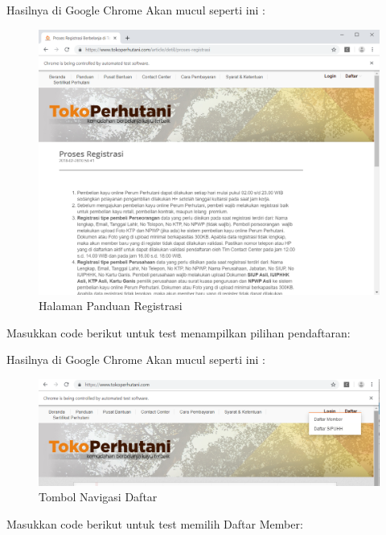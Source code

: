 Hasilnya  di Google Chrome Akan mucul seperti ini :
\begin{figure}[h]
	\centering
	\includegraphics[scale=0.23]{figures/1pdregis}
	\caption{Halaman Panduan Registrasi}
\end{figure}

Masukkan code berikut untuk test menampilkan pilihan pendaftaran:


Hasilnya  di Google Chrome Akan mucul seperti ini :
\begin{figure}[h]
	\centering
	\includegraphics[scale=0.42]{figures/2daftar}
	\caption{Tombol Navigasi Daftar}
\end{figure}

Masukkan code berikut untuk test memilih Daftar Member:



